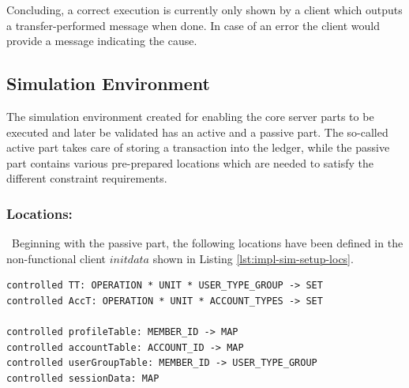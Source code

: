 Concluding, a correct execution is currently only shown by a client which outputs a transfer-performed message when done. In case of an error the client would provide a message indicating the cause.

\subsection{Simulation Environment}
\label{subsec:impl-sim-env}

The simulation environment created for enabling the core server parts to be executed and later be validated has an active and a passive part. The so-called active part takes care of storing a transaction into the ledger, while the passive part contains various pre-prepared locations which are needed to satisfy the different constraint requirements.

\subsubsection{Locations: }\ Beginning with the passive part, the following locations have been defined in the non-functional client $initdata$ shown in Listing \ref{lst:impl-sim-setup-locs}.

\begin{center}
\begin{minipage}{0.8\textwidth}
\small
\begin{lstlisting}[language=bsl_lst,caption={\bf\small Simulation environment locations},label={lst:impl-sim-setup-locs} ]
controlled TT: OPERATION * UNIT * USER_TYPE_GROUP -> SET
controlled AccT: OPERATION * UNIT * ACCOUNT_TYPES -> SET

controlled profileTable: MEMBER_ID -> MAP
controlled accountTable: ACCOUNT_ID -> MAP
controlled userGroupTable: MEMBER_ID -> USER_TYPE_GROUP
controlled sessionData: MAP
\end{lstlisting}
\end{minipage}
\end{center}


